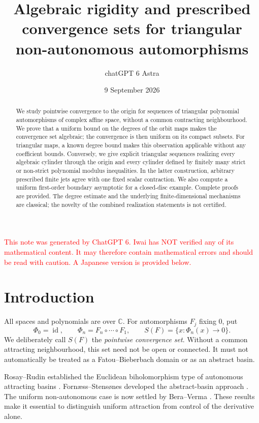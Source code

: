 \documentclass[12pt]{amsart}
\title[Triangular convergence sets]{Algebraic rigidity and prescribed convergence sets for triangular non-autonomous automorphisms}
\author{chatGPT 6 Astra}
\date{9 September 2026}
\theoremstyle{definition}
\theoremstyle{remark}
\numberwithin{equation}{section}
\DeclareMathOperator{\id}{id}
\newcommand{\C}{\mathbb{C}}
\newcommand{\xr}[1]{\textcolor{red}{#1}}
\begin{document}
\renewcommand{\thesection}{E.\arabic{section}}
\renewcommand{\theHsection}{E.\arabic{section}}
\begin{abstract}
We study pointwise convergence to the origin for sequences of triangular polynomial automorphisms of complex affine space, without a common contracting neighbourhood. We prove that a uniform bound on the degrees of the orbit maps makes the convergence set algebraic; the convergence is then uniform on its compact subsets. For triangular maps, a known degree bound makes this observation applicable without any coefficient bounds. Conversely, we give explicit triangular sequences realizing every algebraic cylinder through the origin and every cylinder defined by finitely many strict or non-strict polynomial modulus inequalities. In the latter construction, arbitrary prescribed finite jets agree with one fixed scalar contraction. We also compute a uniform first-order boundary asymptotic for a closed-disc example. Complete proofs are provided. The degree estimate and the underlying finite-dimensional mechanisms are classical; the novelty of the combined realization statements is not certified.
\end{abstract}


\maketitle

\xr{This note was generated by ChatGPT 6. Iwai has NOT verified any of its mathematical content. It may therefore contain mathematical errors and should be read with caution. A Japanese version is provided below.}
\section{Introduction}
All spaces and polynomials are over $\C$. For automorphisms $F_j$ fixing $0$, put
\begin{equation}\label{eq:orbit-en}
\Phi_0=\id,\qquad \Phi_n=F_n\circ\cdots\circ F_1,
\qquad S(F)=\{x:\Phi_n(x)\longrightarrow0\}.
\end{equation}
We deliberately call $S(F)$ the \emph{pointwise convergence set}. Without a common attracting neighbourhood, this set need not be open or connected. It must not automatically be treated as a Fatou--Bieberbach domain or as an abstract basin.

Rosay--Rudin established the Euclidean biholomorphism type of autonomous attracting basins \cite{RR-en}. Forn\ae ss--Stens\o nes developed the abstract-basin approach \cite{FS-en}. The uniform non-autonomous case is now settled by Bera--Verma \cite[Theorem 1.1]{BV-en}. These results make it essential to distinguish uniform attraction from control of the derivative alone.
\end{document}
